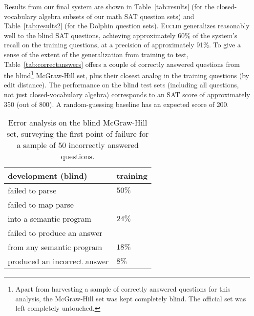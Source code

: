 \documentclass[11pt,letterpaper]{article}
\begin{document}
Results from our final system are shown in Table~\ref{tab:results} (for the closed-vocabulary algebra subsets of our math SAT question sets) and Table~\ref{tab:results2} (for the Dolphin question sets). \textsc{Euclid} generalizes reasonably well to the blind SAT questions, achieving approximately 60\% of the system's recall on the training questions, at a precision of approximately 91\%. To give a sense of the extent of the generalization from training to test, Table~\ref{tab:correctanswers} offers a couple of correctly answered questions from the blind\footnote{Apart from harvesting a sample of correctly answered questions for this analysis, the McGraw-Hill set was kept completely blind. The official set was left completely untouched.} McGraw-Hill set, plus their closest analog in the training questions (by edit distance). The performance on the blind test sets (including all questions, not just closed-vocabulary algebra) corresponds to an SAT score of approximately 350 (out of 800). A random-guessing baseline has an expected score of 200.

\begin{table}[tb]
\begin{center}
\begin{tabular}{|l|l|}
\hline
\textbf{development (blind)} & \textbf{training} \\
\hline
failed to parse & $50\%$ \\
\hline
failed to map parse & \\
into a semantic program & $24\%$ \\
\hline
failed to produce an answer  & \\
from any semantic program & $18\%$ \\
\hline
produced an incorrect answer & $8\%$ \\
\hline
\end{tabular}
\end{center}
\caption{\label{tab:erroranalysis} Error analysis on the blind McGraw-Hill set, surveying the first point of failure for a sample of 50 incorrectly answered questions.}
\end{table}
\end{document}
